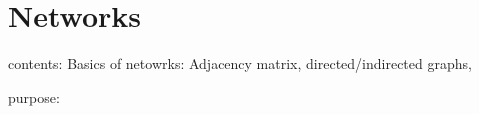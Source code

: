 \section{Networks}\label{chap:networksBasics}
contents: Basics of netowrks: Adjacency matrix, directed/indirected graphs, 

purpose: